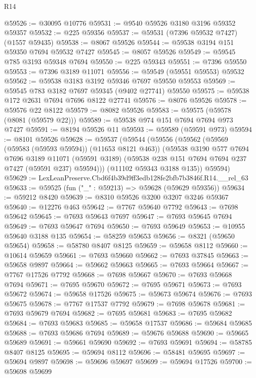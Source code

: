 \begin{lexlean}{R14}
\begin{coremodule}
@59526 := @30095 @10776
@59531 := @9540 @59526 @3180 @3196 @59352 @59357
@59532 := @225 @59356
@59537 := @59531 (@7396 @59532 @7427) (@1557 @59435)
@59538 := @8067 @59526
@59544 := @59538 @3194 @151 @59350 @7694 @59532 @7427
@59545 := @8057 @59526
@59549 := @59545 @785 @3193 @59348 @7694
@59550 := @225 @59343
@59551 := @7396 @59550
@59553 := @7396 @3189 @11071
@59556 := @59549 (@59551 @59553) @59532
@59562 := @59538 @3183 @3192 @59346 @7697 @59550 @59553
@59569 := @59545 @783 @3182 @7697 @59345 (@9402 @27741) @59550
@59575 := @59538 @172 @2631 @7694 @7696 @8122 @27741
@59576 := @8076 @59526
@59578 := @59576 @22 @8122
@59579 := @8082 @59526
@59583 := @59575 (@59578 (@8081 (@59579 @22)))
@59589 := @59538 @974 @151 @7694 @7694 @973 @7427
@59591 := @8194 @59526 @11
@59593 := @59589 (@59591 @973)
@59594 := @8101 @59526
@59628 := @59537
    (@59544
      (@59556
        (@59562
          (@59569 (@59583 (@59593 @59594)) (@11653 @8121 @463))
          (@59538
            @3190
            @577
            @7694
            @7696
            @3189
            @11071
            (@59591 @3189)
            (@59538 @238 @151 @7694 @7694 @237 @7427 (@59591 @237) @59594)))
        (@11102 @59343 @3188 @135))
      @59594)
@59629 := LexLeanPreserve.Cbd6f4b39d9ff3edb128fe2bfb7b3846f.R14.__rel_63
@59633 := @59525 (fun ("_" : @59213) => @59628 (@59629 @59356))
@59634 := @59212 @8420
@59639 := @8310 @59526 @3200 @3207 @3246 @59367
@59640 := @12276 @463
@59642 := @7767 @59640 @7792
@59643 := @7698 @59642
@59645 := @7693 @59643 @7697
@59647 := @7693 @59645 @7694
@59649 := @7693 @59647 @7694
@59650 := @7693 @59649
@59653 := @10955 @59640 @3188 @135
@59654 := @58259 @59653
@59656 := @8321 (@59650 @59654)
@59658 := @58780 @8407 @8125
@59659 := @59658 @8112
@59660 := @10614 @59659
@59661 := @7693 @59660
@59662 := @7693 @37845
@59663 := @59658 @9897
@59664 := @59662 @59663
@59665 := @7693 @59664
@59667 := @7767 @17526 @7792
@59668 := @7698 @59667
@59670 := @7693 @59668 @7694
@59671 := @7695 @59670
@59672 := @7695 @59671
@59673 := @7693 @59672
@59674 := @59658 @17526
@59675 := @59673 @59674
@59676 := @7693 @59675
@59678 := @7767 @17537 @7792
@59679 := @7698 @59678
@59681 := @7693 @59679 @7694
@59682 := @7695 @59681
@59683 := @7695 @59682
@59684 := @7693 @59683
@59685 := @59658 @17537
@59686 := @59684 @59685
@59688 := @7693 @59686 @7694
@59689 := @59676 @59688
@59690 := @59665 @59689
@59691 := @59661 @59690
@59692 := @7693 @59691
@59694 := @58785 @8407 @8125
@59695 := @59694 @8112
@59696 := @58481 @59695
@59697 := @59694 @9897
@59698 := @59696 @59697
@59699 := @59694 @17526
@59700 := @59698 @59699

\end{coremodule}
\end{lexlean}

